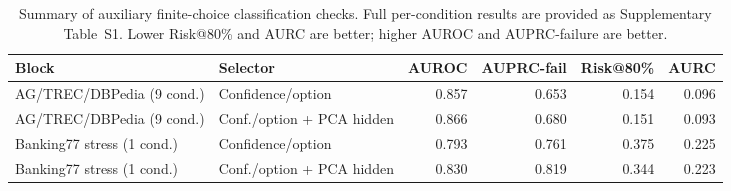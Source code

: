 \begin{table}[t]
\centering
\small
\caption{Summary of auxiliary finite-choice classification checks. Full per-condition results are provided as Supplementary Table~S1. Lower Risk@80\% and AURC are better; higher AUROC and AUPRC-failure are better.}
\label{tab:nonmcq-summary}
\begin{adjustbox}{width=\textwidth}
\begin{tabular}{llrrrr}
\toprule
Block & Selector & AUROC & AUPRC-fail & Risk@80\% & AURC \\
\midrule
AG/TREC/DBPedia (9 cond.) & Confidence/option & 0.857 & 0.653 & 0.154 & 0.096 \\
AG/TREC/DBPedia (9 cond.) & Conf./option + PCA hidden & 0.866 & 0.680 & 0.151 & 0.093 \\
Banking77 stress (1 cond.) & Confidence/option & 0.793 & 0.761 & 0.375 & 0.225 \\
Banking77 stress (1 cond.) & Conf./option + PCA hidden & 0.830 & 0.819 & 0.344 & 0.223 \\
\bottomrule
\end{tabular}
\end{adjustbox}
\end{table}
